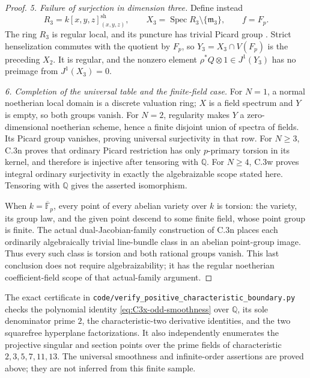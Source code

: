 \begin{proof}
\emph{5. Failure of surjection in dimension three.}
Define instead
\[
 R_3=k[x,y,z]_{(x,y,z)}^{\mathrm{sh}},\qquad
 X_3=\operatorname{Spec}R_3\setminus\{\mathfrak m_3\},
 \qquad f=F_p.
\]
The ring $R_3$ is regular local, and its puncture has
trivial Picard group
\citep[Lemma 52.27.5, Tag 0F2H]{D_StacksRegularPuncture}.
Strict henselization commutes with the quotient by
$F_p$, so $Y_3=X_3\cap V(F_p)$ is the preceding $X_2$.
It is regular, and the nonzero element
$\rho^*Q\otimes1\in J^1(Y_3)$ has no preimage from
$J^1(X_3)=0$.

\emph{6. Completion of the universal table and the finite-field case.}
For $N=1$, a normal noetherian local domain is a discrete
valuation ring; $X$ is a field spectrum and $Y$ is empty,
so both groups vanish. For $N=2$, regularity makes $Y$
a zero-dimensional noetherian scheme, hence a finite
disjoint union of spectra of fields. Its Picard group
vanishes, proving universal surjectivity in that row.
For $N\ge3$, C.3n proves that ordinary Picard restriction
has only $p$-primary torsion in its kernel, and therefore
is injective after tensoring with $\mathbb Q$. For
$N\ge4$, C.3w proves integral ordinary surjectivity in
exactly the algebraizable scope stated here. Tensoring
with $\mathbb Q$ gives the asserted isomorphism.

When $k=\overline{\mathbb F}_p$, every point of every
abelian variety over $k$ is torsion: the variety, its
group law, and the given point descend to some finite
field, whose point group is finite. The actual
dual-Jacobian-family construction of C.3n places
each ordinarily algebraically trivial line-bundle
class in an abelian point-group image. Thus every
such class is torsion and both rational groups vanish.
This last conclusion does not require algebraizability;
it has the regular noetherian coefficient-field scope
of that actual-family argument.
\end{proof}

The exact certificate in
\texttt{code/verify\_positive\_characteristic\_boundary.py}
checks the polynomial identity
\eqref{eq:C3x-odd-smoothness} over $\mathbb Q$, its sole
denominator prime $2$, the characteristic-two derivative
identities, and the two squarefree hyperplane factorizations.
It also independently enumerates the projective singular
and section points over the prime fields of characteristic
$2,3,5,7,11,13$. The universal smoothness and infinite-order
assertions are proved above; they are not inferred from
this finite sample.
